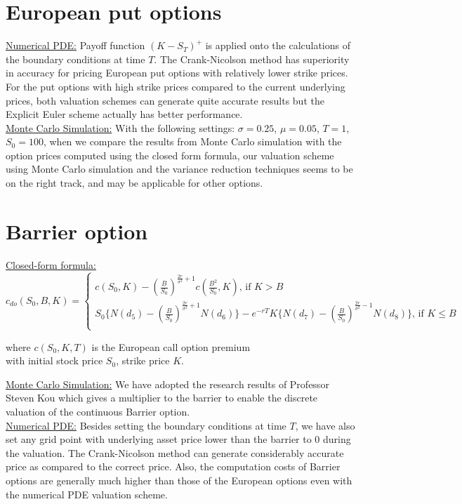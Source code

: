 \section*{European put options}
\underline{Numerical PDE:}
Payoff function $(K - S_{T})^{+}$ is applied onto the calculations of the boundary conditions at time $T$. The Crank-Nicolson method has superiority in accuracy for pricing European put options with relatively lower strike prices. For the put options with high strike prices compared to the current underlying prices, both valuation schemes can generate quite accurate results but the Explicit Euler scheme actually has better performance.\\[1mm]
\underline{Monte Carlo Simulation:}
With the following settings: $\sigma = 0.25$, $\mu = 0.05$, $T = 1$, $S_{0} = 100$, 
when we compare the results from Monte Carlo simulation with the option prices computed using the closed form formula, our valuation scheme using Monte Carlo simulation and the variance reduction techniques seems to be on the right track, and may be applicable for other options.

\section*{Barrier option}
\underline{Closed-form formula:}
\begin{equation*}
c_{do}(S_{0}, B, K) = 
\begin{cases}
c(S_{0}, K) - {(\frac{B}{S_{0}})}^{\frac{2r}{\sigma^{2}}+1} c(\frac{B^{2}}{S_{0}}, K) \text{, if }K > B\\
S_{0}\{ N(d_{5}) - {(\frac{B}{S_{0}})}^{\frac{2r}{\sigma^{2}}+1} N(d_{6})\} - e^{-rT}K\{ N(d_{7}) - {(\frac{B}{S_{0}})}^{\frac{2r}{\sigma^{2}}-1} N(d_{8})\} \text{, if }K \le B\\
\end{cases}
\end{equation*}
\begin{center}
where $c(S_{0}, K, T)$ is the European call option premium\\ with initial stock price $S_{0}$, strike price $K$.
\end{center}
\underline{Monte Carlo Simulation:}
We have adopted the research results of Professor Steven Kou\cite{ContinuityCorrection} which gives a multiplier to the barrier to enable the discrete valuation of the continuous Barrier option.\\[1mm]
\underline{Numerical PDE:}
Besides setting the boundary conditions at time $T$, we have also set any grid point with underlying asset price lower than the barrier to $0$ during the valuation. The Crank-Nicolson method can generate considerably accurate price as compared to the correct price. Also, the computation costs of Barrier options are generally much higher than those of the European options even with the numerical PDE valuation scheme.

